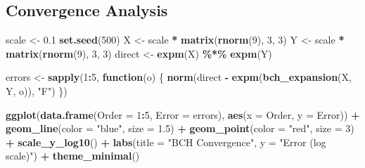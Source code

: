 \documentclass[
]{book}
\newenvironment{Shaded}{\begin{snugshade}}{\end{snugshade}}
\newcommand{\AttributeTok}[1]{\textcolor[rgb]{0.13,0.29,0.53}{#1}}
\newcommand{\ControlFlowTok}[1]{\textcolor[rgb]{0.13,0.29,0.53}{\textbf{#1}}}
\newcommand{\DecValTok}[1]{\textcolor[rgb]{0.00,0.00,0.81}{#1}}
\newcommand{\FloatTok}[1]{\textcolor[rgb]{0.00,0.00,0.81}{#1}}
\newcommand{\FunctionTok}[1]{\textcolor[rgb]{0.13,0.29,0.53}{\textbf{#1}}}
\newcommand{\NormalTok}[1]{#1}
\newcommand{\OtherTok}[1]{\textcolor[rgb]{0.56,0.35,0.01}{#1}}
\newcommand{\SpecialCharTok}[1]{\textcolor[rgb]{0.81,0.36,0.00}{\textbf{#1}}}
\newcommand{\StringTok}[1]{\textcolor[rgb]{0.31,0.60,0.02}{#1}}
\theoremstyle{definition}
\theoremstyle{definition}
\theoremstyle{definition}
\theoremstyle{definition}
\theoremstyle{remark}
\begin{document}
\subsection{Convergence Analysis}\label{convergence-analysis}

\begin{Shaded}
\begin{Highlighting}[]
\NormalTok{scale }\OtherTok{\textless{}{-}} \FloatTok{0.1}
\FunctionTok{set.seed}\NormalTok{(}\DecValTok{500}\NormalTok{)}
\NormalTok{X }\OtherTok{\textless{}{-}}\NormalTok{ scale }\SpecialCharTok{*} \FunctionTok{matrix}\NormalTok{(}\FunctionTok{rnorm}\NormalTok{(}\DecValTok{9}\NormalTok{), }\DecValTok{3}\NormalTok{, }\DecValTok{3}\NormalTok{)}
\NormalTok{Y }\OtherTok{\textless{}{-}}\NormalTok{ scale }\SpecialCharTok{*} \FunctionTok{matrix}\NormalTok{(}\FunctionTok{rnorm}\NormalTok{(}\DecValTok{9}\NormalTok{), }\DecValTok{3}\NormalTok{, }\DecValTok{3}\NormalTok{)}
\NormalTok{direct }\OtherTok{\textless{}{-}} \FunctionTok{expm}\NormalTok{(X) }\SpecialCharTok{\%*\%} \FunctionTok{expm}\NormalTok{(Y)}

\NormalTok{errors }\OtherTok{\textless{}{-}} \FunctionTok{sapply}\NormalTok{(}\DecValTok{1}\SpecialCharTok{:}\DecValTok{5}\NormalTok{, }\ControlFlowTok{function}\NormalTok{(o) \{}
  \FunctionTok{norm}\NormalTok{(direct }\SpecialCharTok{{-}} \FunctionTok{expm}\NormalTok{(}\FunctionTok{bch\_expansion}\NormalTok{(X, Y, o)), }\StringTok{"F"}\NormalTok{)}
\NormalTok{\})}

\FunctionTok{ggplot}\NormalTok{(}\FunctionTok{data.frame}\NormalTok{(}\AttributeTok{Order =} \DecValTok{1}\SpecialCharTok{:}\DecValTok{5}\NormalTok{, }\AttributeTok{Error =}\NormalTok{ errors), }
       \FunctionTok{aes}\NormalTok{(}\AttributeTok{x =}\NormalTok{ Order, }\AttributeTok{y =}\NormalTok{ Error)) }\SpecialCharTok{+}
  \FunctionTok{geom\_line}\NormalTok{(}\AttributeTok{color =} \StringTok{"blue"}\NormalTok{, }\AttributeTok{size =} \FloatTok{1.5}\NormalTok{) }\SpecialCharTok{+}
  \FunctionTok{geom\_point}\NormalTok{(}\AttributeTok{color =} \StringTok{"red"}\NormalTok{, }\AttributeTok{size =} \DecValTok{3}\NormalTok{) }\SpecialCharTok{+}
  \FunctionTok{scale\_y\_log10}\NormalTok{() }\SpecialCharTok{+}
  \FunctionTok{labs}\NormalTok{(}\AttributeTok{title =} \StringTok{"BCH Convergence"}\NormalTok{, }\AttributeTok{y =} \StringTok{"Error (log scale)"}\NormalTok{) }\SpecialCharTok{+}
  \FunctionTok{theme\_minimal}\NormalTok{()}
\end{Highlighting}
\end{Shaded}
\end{document}
